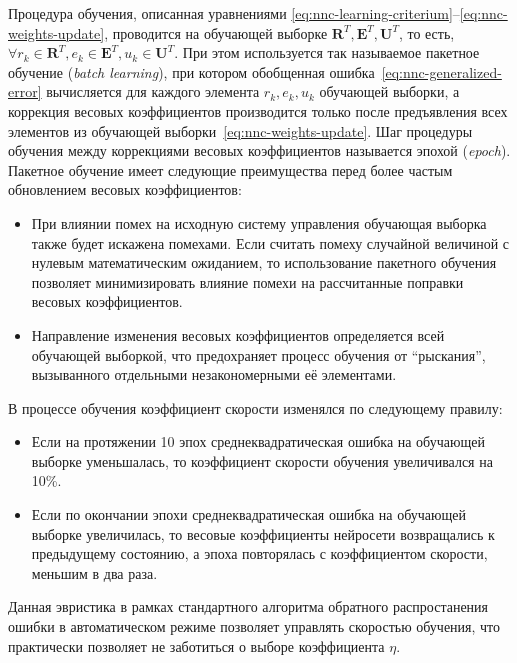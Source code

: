 
Процедура обучения, описанная уравнениями
\eqref{eq:nnc-learning-criterium}--\eqref{eq:nnc-weights-update},
проводится на обучающей выборке
$\mathbf{R}^T,\mathbf{E}^T,\mathbf{U}^T$, то есть, $\forall
r_k\in\mathbf{R}^T, e_k\in\mathbf{E}^T, u_k\in\mathbf{U}^T$.  При этом
используется так называемое пакетное обучение ({\em batch learning}),
при котором обобщенная ошибка~\eqref{eq:nnc-generalized-error}
вычисляется для каждого элемента $r_k,e_k,u_k$ обучающей выборки, а
коррекция весовых коэффициентов производится только после предъявления
всех элементов из обучающей выборки~\eqref{eq:nnc-weights-update}.
Шаг процедуры обучения между коррекциями весовых коэффициентов
называется эпохой ({\em epoch}).  Пакетное обучение имеет следующие
преимущества перед более частым обновлением весовых коэффициентов:
\begin{itemize}
\item При влиянии помех на исходную систему управления обучающая
  выборка также будет искажена помехами.  Если считать помеху
  случайной величиной с нулевым математическим ожиданием, то
  использование пакетного обучения позволяет минимизировать влияние
  помехи на рассчитанные поправки весовых коэффициентов.
\item Направление изменения весовых коэффициентов определяется всей
  обучающей выборкой, что предохраняет процесс обучения от
  ``рыскания'', вызыванного отдельными незакономерными её элементами.
\end{itemize}



В процессе обучения коэффициент скорости изменялся по следующему правилу:
\begin{itemize}
\item Если на протяжении 10 эпох среднеквадратическая ошибка на
  обучающей выборке уменьшалась, то коэффициент скорости обучения
  увеличивался на 10\%.
\item Если по окончании эпохи среднеквадратическая ошибка на обучающей
  выборке увеличилась, то весовые коэффициенты нейросети возвращались
  к предыдущему состоянию, а эпоха повторялась с коэффициентом
  скорости, меньшим в два раза.
\end{itemize}
Данная эвристика в рамках стандартного алгоритма обратного
распростанения ошибки в автоматическом режиме позволяет управлять
скоростью обучения, что практически позволяет не заботиться о выборе
коэффициента $\eta$.

